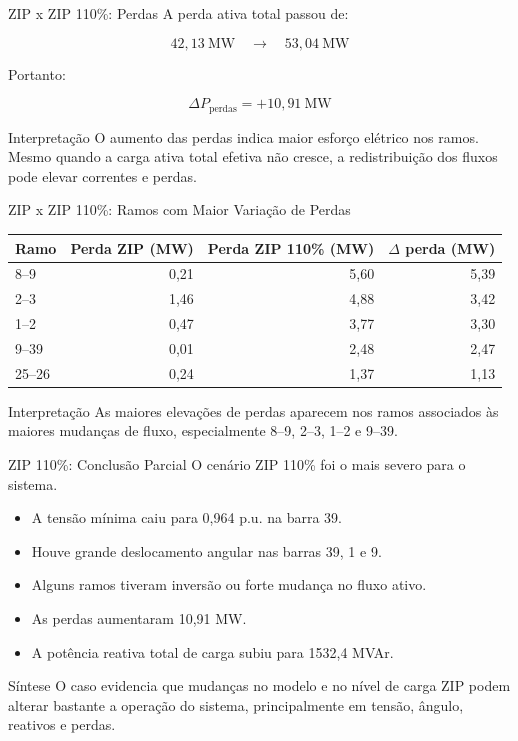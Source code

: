 \documentclass[aspectratio=169,11pt]{beamer}
\newcommand{\pu}{p.u.}
\begin{document}
\begin{frame}{ZIP x ZIP 110\%: Perdas}
  A perda ativa total passou de:

  \[
    42{,}13\ \text{MW} \quad \rightarrow \quad 53{,}04\ \text{MW}
  \]

  Portanto:

  \[
    \Delta P_{\text{perdas}} = +10{,}91\ \text{MW}
  \]

  \begin{block}{Interpretação}
    O aumento das perdas indica maior esforço elétrico nos ramos. Mesmo quando a carga ativa total efetiva não cresce, a redistribuição dos fluxos pode elevar correntes e perdas.
  \end{block}
\end{frame}

\begin{frame}{ZIP x ZIP 110\%: Ramos com Maior Variação de Perdas}
  \begin{table}
    \centering
    \small
    \begin{tabular}{lrrr}
      \toprule
      Ramo & Perda ZIP (MW) & Perda ZIP 110\% (MW) & $\Delta$ perda (MW) \\
      \midrule
      8--9 & 0,21 & 5,60 & 5,39 \\
      2--3 & 1,46 & 4,88 & 3,42 \\
      1--2 & 0,47 & 3,77 & 3,30 \\
      9--39 & 0,01 & 2,48 & 2,47 \\
      25--26 & 0,24 & 1,37 & 1,13 \\
      \bottomrule
    \end{tabular}
  \end{table}

  \begin{block}{Interpretação}
    As maiores elevações de perdas aparecem nos ramos associados às maiores mudanças de fluxo, especialmente 8--9, 2--3, 1--2 e 9--39.
  \end{block}
\end{frame}

\begin{frame}{ZIP 110\%: Conclusão Parcial}
  O cenário ZIP 110\% foi o mais severo para o sistema.

  \begin{itemize}
    \item A tensão mínima caiu para 0,964 \pu{} na barra 39.
    \item Houve grande deslocamento angular nas barras 39, 1 e 9.
    \item Alguns ramos tiveram inversão ou forte mudança no fluxo ativo.
    \item As perdas aumentaram 10,91 MW.
    \item A potência reativa total de carga subiu para 1532,4 MVAr.
  \end{itemize}

  \begin{block}{Síntese}
    O caso evidencia que mudanças no modelo e no nível de carga ZIP podem alterar bastante a operação do sistema, principalmente em tensão, ângulo, reativos e perdas.
  \end{block}
\end{frame}
\end{document}
